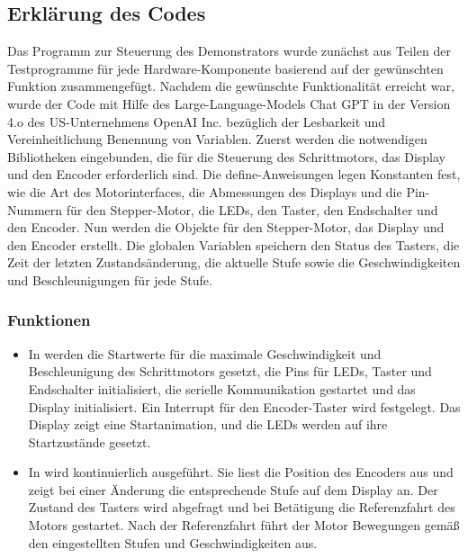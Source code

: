 {{{			\subsection{Erklärung des Codes}
			
			Das Programm zur Steuerung des Demonstrators wurde zunächst aus Teilen der Testprogramme für jede Hardware-Komponente basierend auf der gewünschten Funktion zusammengefügt. Nachdem die gewünschte Funktionalität erreicht war, wurde der Code mit Hilfe des Large-Language-Models Chat GPT in der Version 4.o des US-Unternehmens OpenAI Inc. bezüglich der Lesbarkeit und Vereinheitlichung Benennung von Variablen.
			Zuerst werden die notwendigen Bibliotheken eingebunden, die für die Steuerung des Schrittmotors, das Display und den Encoder erforderlich sind.
			Die define-Anweisungen legen Konstanten fest, wie die Art des Motorinterfaces, die Abmessungen des Displays und die Pin-Nummern für den Stepper-Motor, die LEDs, den Taster, den Endschalter und den Encoder. 
			Nun werden die Objekte für den Stepper-Motor, das Display und den Encoder erstellt.
			Die globalen Variablen speichern den Status des Tasters, die Zeit der letzten Zustandsänderung, die aktuelle Stufe sowie die Geschwindigkeiten und Beschleunigungen für jede Stufe. 
			
			\subsubsection{Funktionen}
			
			\begin{itemize}
				
				\item In  werden die Startwerte für die maximale Geschwindigkeit und Beschleunigung des Schrittmotors gesetzt, die Pins für LEDs, Taster und Endschalter initialisiert, die serielle Kommunikation gestartet und das Display initialisiert. Ein Interrupt für den Encoder-Taster wird festgelegt. Das Display zeigt eine Startanimation, und die LEDs werden auf ihre Startzustände gesetzt. 
				
				\item In  wird kontinuierlich ausgeführt. Sie liest die Position des Encoders aus und zeigt bei einer Änderung die entsprechende Stufe auf dem Display an. Der Zustand des Tasters wird abgefragt und bei Betätigung die Referenzfahrt des Motors gestartet. Nach der Referenzfahrt führt der Motor Bewegungen gemäß den eingestellten Stufen und Geschwindigkeiten aus. 
				

\end{itemize}}}}
